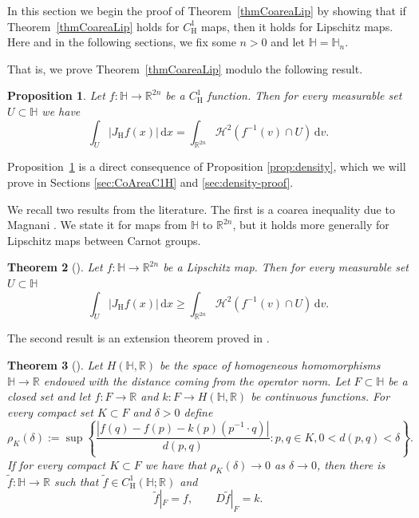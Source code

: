 \documentclass[12pt,reqno]{amsart}
\newcommand{\JfH}{J_\mathrm{H}f}
\newcommand{\HH}{\mathbb{H}}
\newcommand{\R}{\mathbb{R}}
\newcommand{\ud}[0]{\,\mathrm{d}}
\newcommand{\from}{\colon}
\newtheorem{thm}{Theorem}[section]
\newtheorem{prop}[thm]{Proposition}
\theoremstyle{remark}
\newcommand{\0}{\mathbf{0}}
\renewcommand{\1}{\mathbf 1}
\begin{document}
In this section we begin the proof of Theorem~\ref{thmCoareaLip} by showing that if Theorem~\ref{thmCoareaLip} holds for $C^1_{\mathrm{H}}$ maps, then it holds for Lipschitz maps. Here and in the following sections, we fix some $n>0$ and let $\HH = \HH_n$.

That is, we prove Theorem~\ref{thmCoareaLip} modulo the following result.
\begin{prop}\label{propCoareaC1h}
    Let $f\from \HH\to\mathbb R^{2n}$ be a $C^1_{\mathrm{H}}$ function. Then for every measurable set $U\subset\HH$ we have
    \[
    \int_U |\JfH(x)|\ud x = \int_{\mathbb R^{2n}}\mathcal{H}^2(f^{-1}(v)\cap U)\ud v.
    \]
\end{prop}
Proposition~\ref{propCoareaC1h} is a direct consequence of Proposition \ref{prop:density}, which we will prove in Sections \ref{sec:CoAreaC1H} and \ref{sec:density-proof}.

We recall two results from the literature. The first is a coarea inequality due to Magnani \cite{MagnaniCoareaInequality}. We state it for maps from $\HH$ to $\R^{2n}$, but it holds more generally for Lipschitz maps between Carnot groups.
\begin{thm}[{\cite[Theorem 2.6]{MagnaniCoareaInequality}}]\label{thm:CoareaInequality}
    Let $f\from \HH\to \mathbb{R}^{2n}$ be a Lipschitz map. Then for every measurable set $U\subset \mathbb H$
\begin{equation}\label{eqn:CoareaInequality}
     \int_U |\JfH(x)|\ud x \geq \int_{\mathbb R^{2n}}\mathcal{H}^2(f^{-1}(v)\cap U)\ud v.
    \end{equation}
\end{thm}
The second result is an extension theorem proved in \cite{FSSCMathAnn}.
\begin{thm}[{\cite[Theorem 6.8]{FSSCMathAnn}}]\label{thmWithney}
    Let $H(\HH,\mathbb R)$ be the space of homogeneous homomorphisms $\HH\to\mathbb R$ endowed with the distance coming from the operator norm. Let $F\subset \HH$ be a closed set and let $f\from F\to\mathbb R$ and $k\from F\to H(\HH,\mathbb R)$ be continuous functions. For every compact set $K\subset F$ and $\delta>0$ define 
    \begin{equation}\label{eqn:rhokwhit}
    \rho_K(\delta):=\sup\left\{\frac{|f(q)-f(p)-k(p)(p^{-1}\cdot q)|}{d(p,q)}:p,q\in K, 0<d(p,q)<\delta\right\}.
    \end{equation}
    If for every compact $K\subset F$ we have that $\rho_K(\delta)\to 0$ as $\delta\to 0$, then there is $\tilde f\from \HH\to\mathbb R$ such that $\tilde f\in C^1_{\mathrm{H}}(\HH;\mathbb R)$ and 
    \[
    \tilde f|_F = f, \qquad D\tilde f|_F=k.
    \]
\end{thm}
\end{document}
